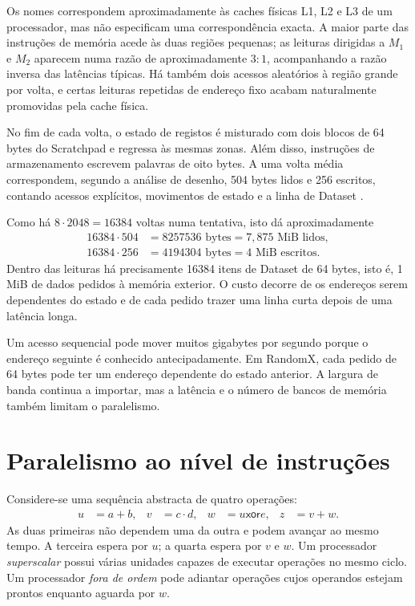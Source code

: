 Os nomes correspondem aproximadamente às caches físicas L1, L2 e L3 de um
processador, mas não especificam uma correspondência exacta. A maior parte das
instruções de memória acede às duas regiões pequenas; as leituras dirigidas a
\(M_1\) e \(M_2\)
aparecem numa razão de aproximadamente \(3:1\), acompanhando a razão inversa
das latências típicas. Há também dois acessos aleatórios à região grande por
volta, e certas leituras repetidas de endereço fixo acabam naturalmente
promovidas pela cache física.

No fim de cada volta, o estado de registos é misturado com dois blocos de 64
bytes do Scratchpad e regressa às mesmas zonas. Além disso, instruções de
armazenamento escrevem palavras de oito bytes. A uma volta média correspondem,
segundo a análise de desenho, 504 bytes lidos e 256 escritos, contando acessos
explícitos, movimentos de estado e a linha de Dataset
\cite{randomx-design-v1}.

Como há \(8\cdot2048=16384\) voltas numa tentativa, isto dá aproximadamente
\begin{align*}
 16384\cdot504&=8257536\text{ bytes}=7{,}875\text{ MiB lidos},\\
 16384\cdot256&=4194304\text{ bytes}=4\text{ MiB escritos}.
\end{align*}
Dentro das leituras há precisamente 16384 itens de Dataset de 64 bytes, isto
é, 1 MiB de dados pedidos à memória exterior. O custo decorre de os endereços
serem dependentes do estado e de cada pedido trazer
uma linha curta depois de uma latência longa.

Um acesso sequencial pode mover muitos gigabytes por segundo porque o endereço
seguinte é conhecido antecipadamente. Em RandomX, cada pedido de 64 bytes pode
ter um endereço dependente do estado anterior. A largura de banda continua a
importar, mas a latência e o número de bancos de memória também limitam o
paralelismo.


\section{Paralelismo ao nível de instruções}
\label{sec:randomx-ilp}

Considere-se uma sequência abstracta de quatro operações:
\begin{align*}
 u&=a+b,& v&=c\cdot d,& w&=u\mathbin{\mathsf{xor}}e,& z&=v+w.
\end{align*}
As duas primeiras não dependem uma da outra e podem avançar ao mesmo tempo.
A terceira espera por \(u\); a quarta espera por \(v\) e \(w\). Um processador
\emph{superscalar} possui várias unidades capazes de executar operações no
mesmo ciclo. Um processador \emph{fora de ordem} pode adiantar operações cujos
operandos estejam prontos enquanto aguarda por \(w\).

